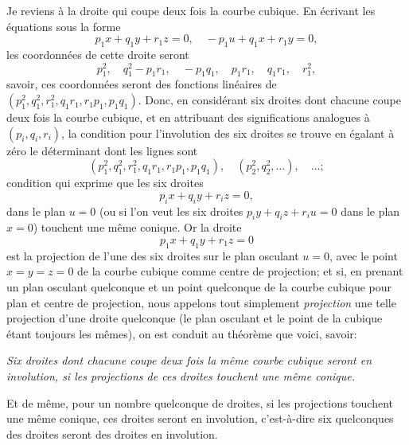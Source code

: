 \documentclass[11pt,a4paper]{article}
\begin{document}
Je reviens \`{a} la droite qui coupe deux fois la courbe cubique. En \'{e}crivant les \'{e}quations sous la forme
\[
p_1 x + q_1 y + r_1 z = 0, \quad -p_1 u + q_1 x + r_1 y = 0,
\]
les coordonn\'{e}es de cette droite seront
\[
p_1^2, \quad q_1^2 - p_1 r_1, \quad -p_1 q_1, \quad p_1 r_1, \quad q_1 r_1, \quad r_1^2,
\]
savoir, ces coordonn\'{e}es seront des fonctions lin\'{e}aires de $(p_1^2, q_1^2, r_1^2, q_1 r_1, r_1 p_1, p_1 q_1)$. Donc, en consid\'{e}rant six droites dont chacune coupe deux fois la courbe cubique, et en attribuant des significations analogues \`{a} $(p_i, q_i, r_i)$, la condition pour l'involution des six droites se trouve en \'{e}galant \`{a} z\'{e}ro le d\'{e}terminant dont les lignes sont
\[
(p_1^2, q_1^2, r_1^2, q_1 r_1, r_1 p_1, p_1 q_1), \quad (p_2^2, q_2^2, \ldots), \quad \ldots;
\]
condition qui exprime que les six droites
\[
p_i x + q_i y + r_i z = 0,
\]
dans le plan $u = 0$ (ou si l'on veut les six droites $p_i y + q_i z + r_i u = 0$ dans le plan $x = 0$) touchent une m\^{e}me conique. Or la droite
\[
p_1 x + q_1 y + r_1 z = 0
\]
est la projection de l'une des six droites sur le plan osculant $u = 0$, avec le point $x = y = z = 0$ de la courbe cubique comme centre de projection; et si, en prenant un plan osculant quelconque et un point quelconque de la courbe cubique pour plan et centre de projection, nous appelons tout simplement \textit{projection} une telle projection d'une droite quelconque (le plan osculant et le point de la cubique \'{e}tant toujours les m\^{e}mes), on est conduit au th\'{e}or\`{e}me que voici, savoir:

\medskip
\noindent\textit{Six droites dont chacune coupe deux fois la m\^{e}me courbe cubique seront en involution, si les projections de ces droites touchent une m\^{e}me conique.}
\medskip

Et de m\^{e}me, pour un nombre quelconque de droites, si les projections touchent une m\^{e}me conique, ces droites seront en involution, c'est-\`{a}-dire six quelconques des droites seront des droites en involution.
\end{document}
